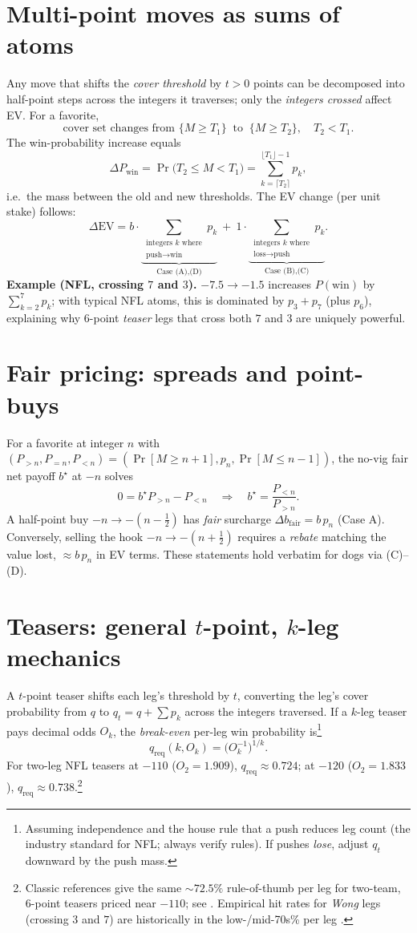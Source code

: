 \documentclass[11pt]{amsart}
\begin{document}
\section{Multi-point moves as sums of atoms}
Any move that shifts the \emph{cover threshold} by $t>0$ points can be decomposed into half-point steps across the integers it traverses; only the \emph{integers crossed} affect EV. For a favorite,
\[
\text{cover set changes from } \{M\ge T_1\}\ \text{ to }\ \{M\ge T_2\},\quad T_2<T_1.
\]
The win-probability increase equals
\[
\Delta P_{\text{win}}=\Pr\big(T_2\le M< T_1\big)=\sum_{k=\lceil T_2\rceil}^{\lfloor T_1\rfloor-1} p_k,
\]
i.e.\ the mass between the old and new thresholds. The EV change (per unit stake) follows:
\[
\Delta \mathrm{EV}= b\cdot \underbrace{\sum_{\substack{\text{integers $k$ where}\\ \text{push}\to\text{win}}} p_k}_{\text{Case (A),(D)}}\ +\ 1\cdot\underbrace{\sum_{\substack{\text{integers $k$ where}\\ \text{loss}\to\text{push}}} p_k}_{\text{Case (B),(C)}}.
\]
\textbf{Example (NFL, crossing $7$ and $3$).} $-7.5\to-1.5$ increases $P(\text{win})$ by $\sum_{k=2}^{7}p_k$; with typical NFL atoms, this is dominated by $p_3+p_7$ (plus $p_6$), explaining why 6-point \emph{teaser} legs that cross both $7$ and $3$ are uniquely powerful.

\section{Fair pricing: spreads and point-buys}
For a favorite at integer $n$ with $(P_{>n},P_{=n},P_{<n})=(\Pr[M\ge n{+}1],p_n,\Pr[M\le n{-}1])$, the no-vig fair net payoff $b^\star$ at $-n$ solves
\[
0=b^\star P_{>n}-P_{<n}\quad\Longrightarrow\quad b^\star=\frac{P_{<n}}{P_{>n}}.
\]
A half-point buy $-n\to -(n-\tfrac12)$ has \emph{fair} surcharge $\Delta b_{\text{fair}}=b\,p_n$ (Case A). Conversely, selling the hook $-n\to -(n+\tfrac12)$ requires a \emph{rebate} matching the value lost, $\approx b\,p_n$ in EV terms. These statements hold verbatim for dogs via (C)--(D).

\section{Teasers: general $t$-point, $k$-leg mechanics}
A $t$-point teaser shifts each leg’s threshold by $t$, converting the leg’s cover probability from $q$ to $q_t=q+\sum p_k$ across the integers traversed. If a $k$-leg teaser pays decimal odds $O_k$, the \emph{break-even} per-leg win probability is\footnote{Assuming independence and the house rule that a push reduces leg count (the industry standard for NFL; always verify rules). If pushes \emph{lose}, adjust $q_t$ downward by the push mass.}
\[
q_{\text{req}}(k,O_k)=\big(O_k^{-1}\big)^{1/k}.
\]
For two-leg NFL teasers at $-110$ ($O_2\!=\!1.909$), $q_{\text{req}}\approx 0.724$; at $-120$ ($O_2\!=\!1.833$), $q_{\text{req}}\approx 0.738$.\footnote{Classic references give the same $\sim\!72.5\%$ rule-of-thumb per leg for two-team, 6-point teasers priced near $-110$; see \cite{Wizard-Teaser,Dox-Wong,SBO-Wong}. Empirical hit rates for \emph{Wong} legs (crossing $3$ and $7$) are historically in the low-/mid-70s\% per leg \cite{Wizard-TeaserPage}.}
\end{document}
